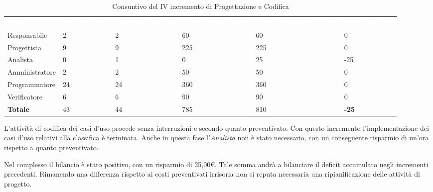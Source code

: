 \begin{table}[H]
\begin{center}
\renewcommand{\arraystretch}{1.5}
\begin{tabular}{ m{}<{\centering}  m{}<{\centering} m{}<{\centering} m{}<{\centering} m{}<{\centering} m{}<{\centering}}
	\rowcolor{darkblue}
	\textcolor{white}{\textbf{Ruolo}} & \textcolor{white}{\textbf{Ore Effettive}} & \textcolor{white}{\textbf{Ore Preventivate}}&\textcolor{white}{\textbf{Costo Effettivo (\euro)}}&\textcolor{white}{\textbf{Costo Preventivato (\euro)}}&\textcolor{white}{\textbf{Differenza (\euro)}}\\ 

	Responsabile  & 2 & 2 & 60 & 60 & 0\\	
	
	Progettista & 9 & 9 & 225 & 225 & 0\\
	
	Analista & 0 & 1 & 0 & 25 & -25\\
	
	Amministratore & 2 & 2 & 50 & 50 & 0\\
	
	Programmatore & 24 & 24 & 360 & 360 & 0\\
	
	Verificatore & 6 & 6 & 90 & 90 & 0\\
	
	\textbf{Totale} & 43 & 44 & 785 & 810 & \textbf{-25} \\
	
\end{tabular}
\caption{Consuntivo del IV incremento di Progettazione e Codifica}
\end{center}
\end{table}

L'attività di codifica dei casi d'uso procede senza interruzioni e secondo quanto preventivato. Con questo incremento l'implementazione dei casi d'uso relativi alla classifica è terminata. Anche in questa fase l'\textit{Analista} non è stato necessario, con un conseguente risparmio di un'ora rispetto a quanto preventivato. 

Nel complesso il bilancio è stato positivo, con un risparmio di 25,00\euro. Tale somma andrà a bilanciare il deficit accumulato negli incrementi precedenti. Rimanendo una differenza rispetto ai costi preventivati irrisoria non si reputa necessaria una ripianificazione delle attività di progetto.

